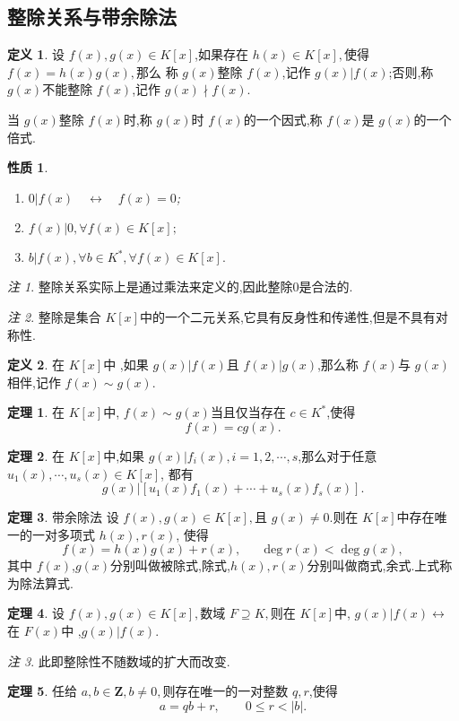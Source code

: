 \documentclass[a4paper,11pt]{article}%
\theoremstyle{remark}
\newtheorem*{remark}{注}
\theoremstyle{definition}
\newtheorem{theorem}{定理}[section]
\theoremstyle{definition}
\newtheorem*{definition}{定义}
\theoremstyle{plain}
\newtheorem*{property}{性质}
\newcommand*{\abs}[1]{\lvert #1 \rvert}
\begin{document}
\subsection{整除关系与带余除法}
\begin{definition}
    设 $f(x),g(x)\in K[x]$,如果存在 $h(x)\in K[x],$使得 $f(x)=h(x)g(x),$那么
    称 $g(x)$整除 $f(x)$,记作 $g(x)|f(x)$;否则,称 $g(x)$不能整除 $f(x)$,记作 $g(x)\nmid f(x).$

    当 $g(x)$整除 $f(x)$时,称 $g(x)$时 $f(x)$的一个因式,称 $f(x)$是 $g(x)$的一个倍式.
\end{definition}
\begin{property}
    
\begin{enumerate}
\item $0|f(x)\phantom{11}\leftrightarrow\phantom{11}f(x)=0$;
\item $f(x)|0,\forall f(x)\in K[x];$
\item $b|f(x),\forall b\in K^*,\forall f(x)\in K[x].$
\end{enumerate}
\end{property}
\begin{remark}
    整除关系实际上是通过乘法来定义的,因此整除0是合法的.
\end{remark}
\begin{remark}
    整除是集合 $K[x]$中的一个二元关系,它具有反身性和传递性,但是不具有对称性.
\end{remark}
\begin{definition}
    在 $K[x]$中 ,如果 $g(x)|f(x)$且 $f(x)|g(x)$,那么称 $f(x)$与 $g(x)$相伴,记作 $f(x)\sim g(x)$.
\end{definition}
\begin{theorem}
    在 $K[x]$中, $f(x)\sim g(x)$当且仅当存在 $c\in K^*$,使得
    \[f(x)=cg(x).\]
\end{theorem}
\begin{theorem}
    在 $K[x]$中,如果 $g(x)|f_i(x),i=1,2,\cdots,s$,那么对于任意 $u_1(x),\cdots,u_s(x)\in K[x]$,
    都有 
    \[g(x)|[u_1(x)f_1(x)+\cdots+u_s(x)f_s(x)].\]
\end{theorem}
\begin{theorem}{带余除法}
    设 $f(x),g(x)\in K[x],$且 $g(x)\neq 0.$则在 $K[x]$中存在唯一的一对多项式 $h(x),r(x)$,
    使得
    \[f(x)=h(x)g(x)+r(x),\phantom{111}\deg r(x)<\deg g(x),\]
    其中 $f(x)$,$g(x)$分别叫做被除式,除式,$h(x),r(x)$分别叫做商式,余式.上式称为除法算式.
\end{theorem}
\begin{theorem}
    设 $f(x),g(x)\in K[x],$数域 $F\supseteq K,$则在 $K[x]$中, $g(x)|f(x)\leftrightarrow$
    在 $F(x)$中 ,$g(x)|f(x)$.
\end{theorem}
\begin{remark}
    此即整除性不随数域的扩大而改变.
\end{remark}
\begin{theorem}
    任给 $a,b\in \mathbf{Z},b\neq 0,$则存在唯一的一对整数 $q,r$,使得
    \[a=qb+r,\phantom{1111}0\leq r<\abs{b}.\]
\end{theorem}
\end{document}
